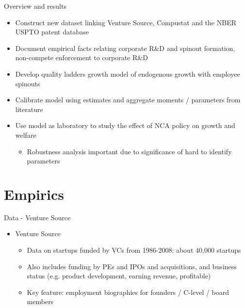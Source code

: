 \documentclass[english,usenames,dvipsnames]{beamer}
\begin{document}
\begin{frame}{Overview and results}
\begin{itemize}
	\item Construct new dataset linking Venture Source, Compustat and the NBER USPTO patent database
	\item Document empirical facts relating corporate R\&D and spinout formation, non-compete enforcement to corporate R\&D
	\item Develop quality ladders growth model of endogenous growth with employee spinouts
	\item Calibrate model using estimates and aggregate moments / parameters from literature
	\item Use model as laboratory to study the effect of NCA policy on growth and welfare
	\begin{itemize}
		\item Robustness analysis important due to significance of hard to identify parameters
	\end{itemize}
\end{itemize}
\end{frame}

\section{Empirics}

\begin{frame}
	\tableofcontents[currentsection]
\end{frame}


\begin{frame}{Data - Venture Source}
\begin{itemize}
	\item Venture Source
	\begin{itemize}
		\item Data on startups funded by VCs from 1986-2008: about 40,000 startups
		\item Also includes funding by PEs and IPOs and acquisitions, and business status (e.g. product development, earning revenue, profitable)
		\item \alert{Key feature: } employment biographies for founders / C-level / board members \\
	\end{itemize}
\end{itemize}
\end{frame}
\end{document}

